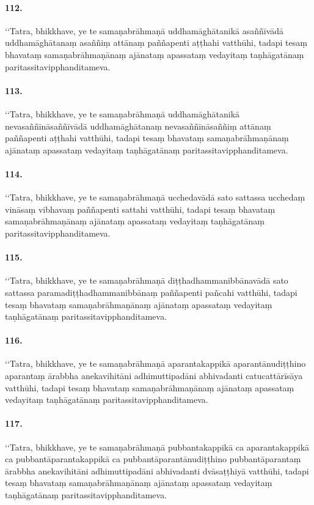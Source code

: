 \paragraph{112.}
‘‘Tatra, bhikkhave, ye te samaṇabrāhmaṇā uddhamāghātanikā asaññīvādā uddhamāghātanaṃ asaññiṃ attānaṃ paññapenti aṭṭhahi vatthūhi, tadapi tesaṃ bhavataṃ samaṇabrāhmaṇānaṃ ajānataṃ apassataṃ vedayitaṃ taṇhāgatānaṃ paritassitavipphanditameva.

\paragraph{113.}
‘‘Tatra, bhikkhave, ye te samaṇabrāhmaṇā uddhamāghātanikā nevasaññīnāsaññīvādā uddhamāghātanaṃ nevasaññīnāsaññiṃ attānaṃ paññapenti aṭṭhahi vatthūhi, tadapi tesaṃ bhavataṃ samaṇabrāhmaṇānaṃ ajānataṃ apassataṃ vedayitaṃ taṇhāgatānaṃ paritassitavipphanditameva.

\paragraph{114.}
‘‘Tatra, bhikkhave, ye te samaṇabrāhmaṇā ucchedavādā sato sattassa ucchedaṃ vināsaṃ vibhavaṃ paññapenti sattahi vatthūhi, tadapi tesaṃ bhavataṃ samaṇabrāhmaṇānaṃ ajānataṃ apassataṃ vedayitaṃ taṇhāgatānaṃ paritassitavipphanditameva.

\paragraph{115.}
‘‘Tatra, bhikkhave, ye te samaṇabrāhmaṇā diṭṭhadhammanibbānavādā sato sattassa paramadiṭṭhadhammanibbānaṃ paññapenti pañcahi vatthūhi, tadapi tesaṃ bhavataṃ samaṇabrāhmaṇānaṃ ajānataṃ apassataṃ vedayitaṃ taṇhāgatānaṃ paritassitavipphanditameva.

\paragraph{116.}
‘‘Tatra, bhikkhave, ye te samaṇabrāhmaṇā aparantakappikā aparantānudiṭṭhino aparantaṃ ārabbha anekavihitāni adhimuttipadāni abhivadanti catucattārīsāya vatthūhi, tadapi tesaṃ bhavataṃ samaṇabrāhmaṇānaṃ ajānataṃ apassataṃ vedayitaṃ taṇhāgatānaṃ paritassitavipphanditameva.

\paragraph{117.}
‘‘Tatra, bhikkhave, ye te samaṇabrāhmaṇā pubbantakappikā ca aparantakappikā ca pubbantāparantakappikā ca pubbantāparantānudiṭṭhino pubbantāparantaṃ ārabbha anekavihitāni adhimuttipadāni abhivadanti dvāsaṭṭhiyā vatthūhi, tadapi tesaṃ bhavataṃ samaṇabrāhmaṇānaṃ ajānataṃ apassataṃ vedayitaṃ taṇhāgatānaṃ paritassitavipphanditameva.

